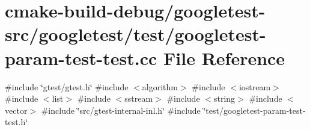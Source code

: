 \hypertarget{googletest-param-test-test_8cc}{}\section{cmake-\/build-\/debug/googletest-\/src/googletest/test/googletest-\/param-\/test-\/test.cc File Reference}
\label{googletest-param-test-test_8cc}
{\ttfamily \#include \char`\"{}gtest/gtest.\+h\char`\"{}}\newline
{\ttfamily \#include $<$algorithm$>$}\newline
{\ttfamily \#include $<$iostream$>$}\newline
{\ttfamily \#include $<$list$>$}\newline
{\ttfamily \#include $<$sstream$>$}\newline
{\ttfamily \#include $<$string$>$}\newline
{\ttfamily \#include $<$vector$>$}\newline
{\ttfamily \#include \char`\"{}src/gtest-\/internal-\/inl.\+h\char`\"{}}\newline
{\ttfamily \#include \char`\"{}test/googletest-\/param-\/test-\/test.\+h\char`\"{}}\newline
